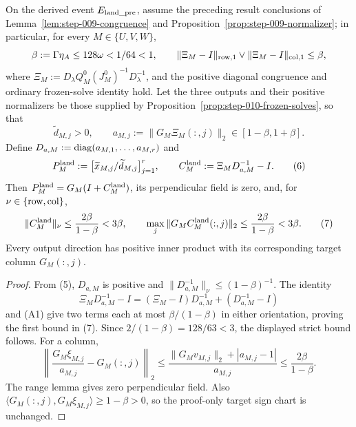 \begin{proposition}\label{prop:step-010-directions}
On the derived event \(E_{\rm land\_pre}\), assume
the preceding result conclusions of Lemma~\ref{lem:step-009-congruence} and
Proposition~\ref{prop:step-009-normalizer}; in particular, for every
\(M\in\{U,V,W\}\),
\[
\beta:=\Gamma\eta_A\le128\omega<1/64<1,\qquad
\|\Xi_M-I\|_{\rm row,1}\vee\|\Xi_M-I\|_{\rm col,1}\le\beta,
\]
where \(\Xi_M:=D_\lambda Q_M^0(J_M^0)^{-1}D_\lambda^{-1}\), and the positive
diagonal congruence and ordinary frozen-solve identity hold.
Let the three outputs and their positive normalizers be those supplied by
Proposition~\ref{prop:step-010-frozen-solves}, so that
\[
\widetilde d_{M,j}>0,\qquad
a_{M,j}:=\|G_M\Xi_M(:,j)\|_2\in[1-\beta,1+\beta].
\]
Define \(D_{a,M}:={\rm diag}(a_{M,1},\ldots,a_{M,r})\) and
\[
P_M^{\rm land}:=\big[\widetilde x_{M,j}/\widetilde d_{M,j}\big]_{j=1}^r,
\qquad C_M^{\rm land}:=\Xi_MD_{a,M}^{-1}-I. \tag{6}
\]
Then \(P_M^{\rm land}=G_M(I+C_M^{\rm land})\), its perpendicular field is
zero, and, for \(\nu\in\{{\rm row},{\rm col}\}\),
\[
\|C_M^{\rm land}\|_\nu\le\frac{2\beta}{1-\beta}<3\beta,\qquad
\max_j\|G_MC_M^{\rm land}(:,j)\|_2
\le\frac{2\beta}{1-\beta}<3\beta. \tag{7}
\]
Every output direction has positive inner product with its corresponding
target column \(G_M(:,j)\).

\begin{proof}
From (5), \(D_{a,M}\) is positive and
\(\|D_{a,M}^{-1}\|_\nu\le(1-\beta)^{-1}\).  The identity
\[
\Xi_MD_{a,M}^{-1}-I
=(\Xi_M-I)D_{a,M}^{-1}+(D_{a,M}^{-1}-I) \tag{8}
\]
and (A1) give two terms each at most \(\beta/(1-\beta)\) in either
orientation, proving the first bound in (7).  Since
\(2/(1-\beta)=128/63<3\), the displayed strict bound follows.
For a column,
\[
\left\|\frac{G_M\xi_{M,j}}{a_{M,j}}-G_M(:,j)\right\|_2
\le\frac{\|G_Mv_{M,j}\|_2+|a_{M,j}-1|}{a_{M,j}}
\le\frac{2\beta}{1-\beta}.
\]
The range lemma gives zero perpendicular field.  Also
\(\langle G_M(:,j),G_M\xi_{M,j}\rangle\ge1-\beta>0\), so the proof-only
target sign chart is unchanged.


\end{proof}
\end{proposition}
